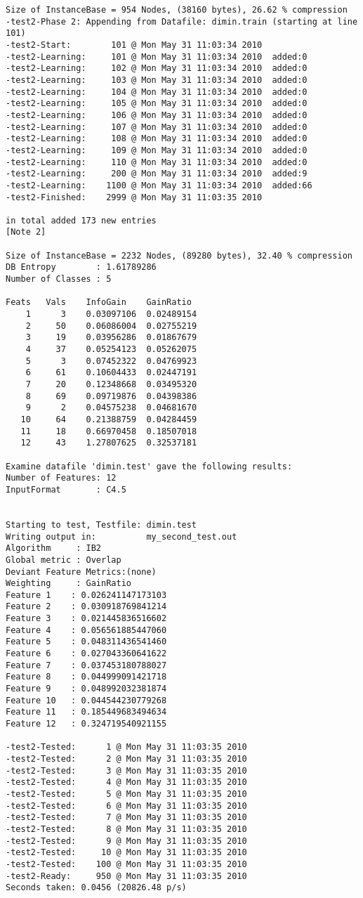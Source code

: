 \documentclass{report}
\begin{document}
\begin{footnotesize}
\begin{verbatim}
Size of InstanceBase = 954 Nodes, (38160 bytes), 26.62 % compression
-test2-Phase 2: Appending from Datafile: dimin.train (starting at line 101)
-test2-Start:        101 @ Mon May 31 11:03:34 2010
-test2-Learning:     101 @ Mon May 31 11:03:34 2010	 added:0
-test2-Learning:     102 @ Mon May 31 11:03:34 2010	 added:0
-test2-Learning:     103 @ Mon May 31 11:03:34 2010	 added:0
-test2-Learning:     104 @ Mon May 31 11:03:34 2010	 added:0
-test2-Learning:     105 @ Mon May 31 11:03:34 2010	 added:0
-test2-Learning:     106 @ Mon May 31 11:03:34 2010	 added:0
-test2-Learning:     107 @ Mon May 31 11:03:34 2010	 added:0
-test2-Learning:     108 @ Mon May 31 11:03:34 2010	 added:0
-test2-Learning:     109 @ Mon May 31 11:03:34 2010	 added:0
-test2-Learning:     110 @ Mon May 31 11:03:34 2010	 added:0
-test2-Learning:     200 @ Mon May 31 11:03:34 2010	 added:9
-test2-Learning:    1100 @ Mon May 31 11:03:34 2010	 added:66
-test2-Finished:    2999 @ Mon May 31 11:03:35 2010

in total added 173 new entries                                      [Note 2]

Size of InstanceBase = 2232 Nodes, (89280 bytes), 32.40 % compression
DB Entropy        : 1.61789286
Number of Classes : 5

Feats	Vals	InfoGain	GainRatio
    1      3	0.03097106	0.02489154
    2     50	0.06086004	0.02755219
    3     19	0.03956286	0.01867679
    4     37	0.05254123	0.05262075
    5      3	0.07452322	0.04769923
    6     61	0.10604433	0.02447191
    7     20	0.12348668	0.03495320
    8     69	0.09719876	0.04398386
    9      2	0.04575238	0.04681670
   10     64	0.21388759	0.04284459
   11     18	0.66970458	0.18507018
   12     43	1.27807625	0.32537181

Examine datafile 'dimin.test' gave the following results:
Number of Features: 12
InputFormat       : C4.5


Starting to test, Testfile: dimin.test
Writing output in:          my_second_test.out
Algorithm     : IB2
Global metric : Overlap
Deviant Feature Metrics:(none)
Weighting     : GainRatio
Feature 1	 : 0.026241147173103
Feature 2	 : 0.030918769841214
Feature 3	 : 0.021445836516602
Feature 4	 : 0.056561885447060
Feature 5	 : 0.048311436541460
Feature 6	 : 0.027043360641622
Feature 7	 : 0.037453180788027
Feature 8	 : 0.044999091421718
Feature 9	 : 0.048992032381874
Feature 10	 : 0.044544230779268
Feature 11	 : 0.185449683494634
Feature 12	 : 0.324719540921155

-test2-Tested:      1 @ Mon May 31 11:03:35 2010
-test2-Tested:      2 @ Mon May 31 11:03:35 2010
-test2-Tested:      3 @ Mon May 31 11:03:35 2010
-test2-Tested:      4 @ Mon May 31 11:03:35 2010
-test2-Tested:      5 @ Mon May 31 11:03:35 2010
-test2-Tested:      6 @ Mon May 31 11:03:35 2010
-test2-Tested:      7 @ Mon May 31 11:03:35 2010
-test2-Tested:      8 @ Mon May 31 11:03:35 2010
-test2-Tested:      9 @ Mon May 31 11:03:35 2010
-test2-Tested:     10 @ Mon May 31 11:03:35 2010
-test2-Tested:    100 @ Mon May 31 11:03:35 2010
-test2-Ready:     950 @ Mon May 31 11:03:35 2010
Seconds taken: 0.0456 (20826.48 p/s)


\end{verbatim}
\end{footnotesize}
\end{document}
